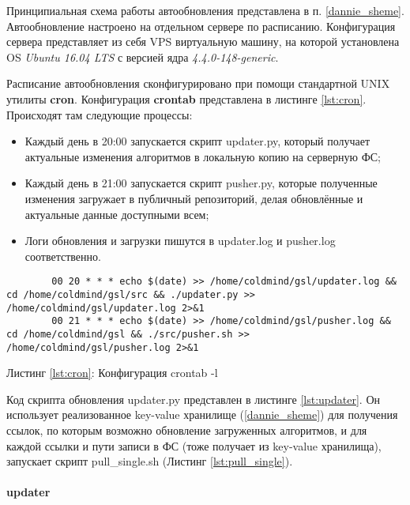 Принципиальная схема работы автообновления представлена в п. \ref{dannie_sheme}.\\
Автообновление настроено на отдельном сервере по расписанию. Конфигурация
сервера представляет из себя VPS виртуальную машину, на которой установлена OS
\emph{Ubuntu 16.04 LTS} с версией ядра \emph{4.4.0-148-generic}.

Расписание автообновления сконфигурировано при помощи стандартной UNIX утилиты
\textbf{cron}.  Конфигурация \textbf{crontab} представлена в листинге
\ref{lst:cron}. Происходят там следующие процессы:

\begin{itemize}
    \item Каждый день в 20:00 запускается скрипт {\small updater.py}, который получает актуальные изменения алгоритмов в локальную копию на серверную ФС;
    \item Каждый день в 21:00 запускается скрипт {\small pusher.py}, которые полученные изменения загружает в публичный репозиторий, делая обновлённые и актуальные данные доступными всем;
    \item Логи обновления и загрузки пишутся в {\small updater.log} и {\small pusher.log} соответственно.
\end{itemize}

\begin{center}
\begin{lstlisting}
        00 20 * * * echo $(date) >> /home/coldmind/gsl/updater.log && cd /home/coldmind/gsl/src && ./updater.py >> /home/coldmind/gsl/updater.log 2>&1
        00 21 * * * echo $(date) >> /home/coldmind/gsl/pusher.log && cd /home/coldmind/gsl && ./src/pusher.sh >> /home/coldmind/gsl/pusher.log 2>&1
\end{lstlisting}\label{lst:cron}
    Листинг \ref{lst:cron}: Конфигурация {\small crontab -l}
\end{center}

Код скрипта обновления {\small updater.py} представлен в листинге
\ref{lst:updater}. Он использует реализованное key-value хранилище (\ref{dannie_sheme}) для
получения ссылок, по которым возможно обновление загруженных алгоритмов, и для
каждой ссылки и пути записи в ФС (тоже получает из key-value хранилища),
запускает скрипт {\small pull\_single.sh} (Листинг \ref{lst:pull_single}).

\paragraph{updater}

